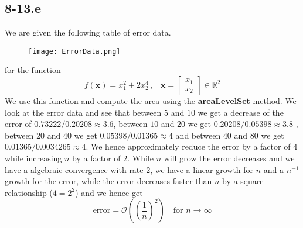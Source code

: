 \documentclass{article}
\begin{document}
\subsection*{8-13.e} 
We are given the following table of error data.

\begin{figure}[!hbt]
    \centering
\texttt{[image: ErrorData.png]}
\end{figure}

for the function
\begin{equation*}
    f\left(\mathbf{x}\right) = x_{1}^{2} + 2x_{2}^{4} \, \text{,} \quad \mathbf{x} = \begin{bmatrix}
        x_{1} \\ x_{2}
    \end{bmatrix} \in \mathbb{R}^{2}
\end{equation*}
We use this function and compute the area using the \textbf{areaLevelSet} method. We look at the error data and see that between $5$ and $10$ we get a decrease of the error of $0.73222 / 0.20208 \approx 3.6$, between $10$ and $20$ we get $0.20208 / 0.05398 \approx 3.8$ , between $20$ and $40$ we get $0.05398 / 0.01365 \approx 4$ and between $40$ and $80$ we get $0.01365 / 0.0034265 \approx 4$. We hence approximately reduce the error by a factor of $4$ while increasing $n$ by a factor of $2$. While $n$ will grow the error decreases and we have a algebraic convergence with rate $2$, we have a linear growth for $n$ and a $n^{-1}$ growth for the error, while the error decreases faster than $n$ by a square relationship ($4 = 2^{2}$) and we hence get
\begin{equation*}
    \text{error} = \mathcal{O}\left(\left(\frac{1}{n}\right)^{2}\right) \quad \text{for } n \to \infty 
\end{equation*}
\end{document}
